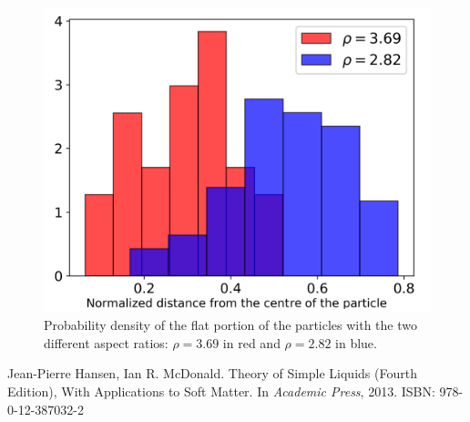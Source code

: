 \documentclass{article}
\begin{document}
\begin{figure}
    \centering
    \includegraphics[width=1\columnwidth]{maxlength_div.png}
    \caption{Probability density of the flat portion of the particles with the two different aspect ratios: $\rho=3.69$ in red and $\rho=2.82$ in blue.}
    \label{fig:maxlength_div}
\end{figure}

\begin{thebibliography}{1}
Jean-Pierre Hansen, Ian R. McDonald.
\newblock Theory of Simple Liquids (Fourth Edition), With Applications to Soft Matter.
\newblock In {\em Academic Press}, 2013. ISBN: 978-0-12-387032-2


\end{thebibliography}
\end{document}
